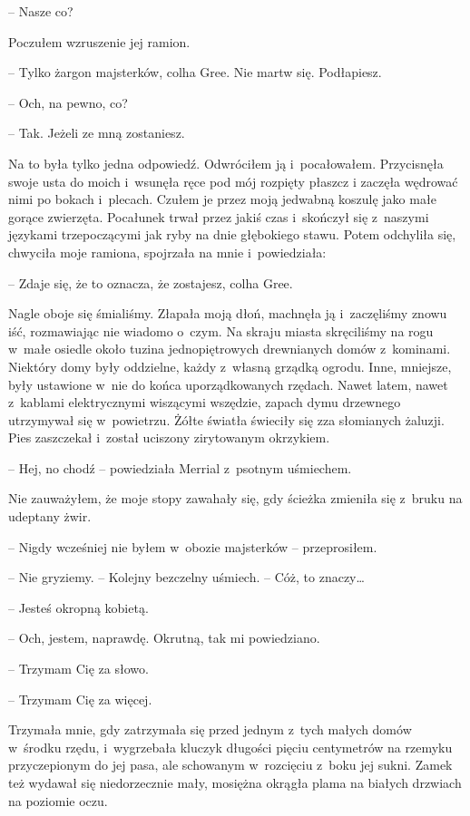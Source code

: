 \documentclass[oneside,polish,11pt,sfheadings]{mwbk}
\begin{document}
-- Nasze co?

Poczułem wzruszenie jej ramion.

-- Tylko żargon majsterków, colha Gree. Nie martw się. Podłapiesz.

-- Och, na pewno, co?

-- Tak. Jeżeli ze mną zostaniesz.

Na to była tylko jedna odpowiedź. Odwróciłem ją i~pocałowałem.
Przycisnęła swoje usta do moich i~wsunęła ręce pod mój rozpięty płaszcz
i zaczęła wędrować nimi po bokach i~plecach. Czułem je przez moją
jedwabną koszulę jako małe gorące zwierzęta. Pocałunek trwał przez jakiś
czas i~skończył się z~naszymi językami trzepoczącymi jak ryby na dnie
głębokiego stawu. Potem odchyliła się, chwyciła moje ramiona, spojrzała
na mnie i~powiedziała: 

-- Zdaje się, że to oznacza, że zostajesz, colha
Gree.

Nagle oboje się śmialiśmy. Złapała moją dłoń, machnęła ją i~zaczęliśmy
znowu iść, rozmawiając nie wiadomo o~czym. Na skraju miasta skręciliśmy
na rogu w~małe osiedle około tuzina jednopiętrowych drewnianych domów z~kominami. Niektóry domy były oddzielne, każdy z~własną grządką ogrodu.
Inne, mniejsze, były ustawione w~nie do końca uporządkowanych rzędach.
Nawet latem, nawet z~kablami elektrycznymi wiszącymi wszędzie, zapach
dymu drzewnego utrzymywał się w~powietrzu. Żółte światła świeciły się
zza słomianych żaluzji. Pies zaszczekał i~został uciszony zirytowanym
okrzykiem.

-- Hej, no chodź -- powiedziała Merrial z~psotnym uśmiechem.

Nie zauważyłem, że moje stopy zawahały się, gdy ścieżka zmieniła się z~bruku na udeptany żwir.

-- Nigdy wcześniej nie byłem w~obozie majsterków -- przeprosiłem.

-- Nie gryziemy. -- Kolejny bezczelny uśmiech. -- Cóż, to znaczy\ldots

-- Jesteś okropną kobietą.

-- Och, jestem, naprawdę. Okrutną, tak mi powiedziano.

-- Trzymam Cię za słowo.

-- Trzymam Cię za więcej.

Trzymała mnie, gdy zatrzymała się przed jednym z~tych małych domów w~środku rzędu, i~wygrzebała kluczyk długości pięciu centymetrów na
rzemyku przyczepionym do jej pasa, ale schowanym w~rozcięciu z~boku jej
sukni. Zamek też wydawał się niedorzecznie mały, mosiężna okrągła plama
na białych drzwiach na poziomie oczu.
\end{document}
